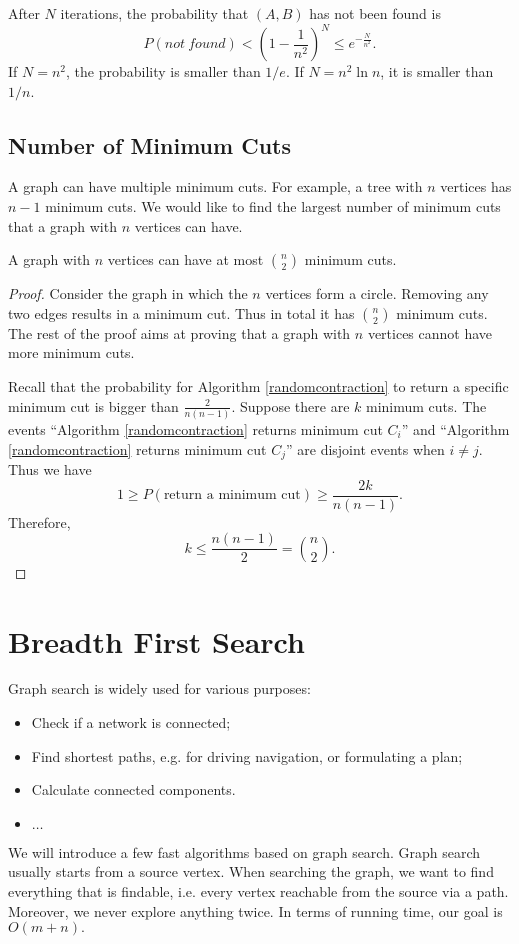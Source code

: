 After $N$ iterations, the probability that $(A,B)$ has not been found is 
\begin{equation*}
P(not\:found)<\left(1-\frac{1}{n^2}\right)^N\leq e^{-\frac{N}{n^2}}.
\end{equation*}
If $N=n^2$, the probability is smaller than $1/e$. If $N=n^2\ln n$, it is smaller than $1/n$. 
\subsection{Number of Minimum Cuts}
A graph can have multiple minimum cuts. For example, a tree with $n$ vertices has $n-1$ minimum cuts. We would like to find the largest number of minimum cuts that a graph with $n$ vertices can have.
\begin{theorem}
A graph with $n$ vertices can have at most $\binom{n}{2}$ minimum cuts.
\end{theorem}
\begin{proof}
Consider the graph in which the $n$ vertices form a circle. Removing any two edges results in a minimum cut. Thus in total it has $\binom{n}{2}$ minimum cuts. The rest of the proof aims at proving that a graph with $n$ vertices cannot have more minimum cuts.

Recall that the probability for Algorithm \ref{randomcontraction} to return a specific minimum cut is bigger than $\frac{2}{n(n-1)}$. Suppose there are $k$ minimum cuts. The events ``Algorithm \ref{randomcontraction} returns minimum cut $C_i$'' and  ``Algorithm \ref{randomcontraction} returns minimum cut $C_j$'' are disjoint events when $i\neq j$. Thus we have 
$$1\geq P(\text{return a minimum cut})\geq\frac{2k}{n(n-1)}.$$
Therefore, 
$$k\leq \frac{n(n-1)}{2}=\binom{n}{2}.$$
\end{proof}
\section{Breadth First Search}
Graph search is widely used for various purposes:
\begin{itemize}
\item Check if a network is connected;
\item Find shortest paths, e.g. for driving navigation, or formulating a plan;
\item Calculate connected components.
\item $\dots$
\end{itemize}
We will introduce a few fast algorithms based on graph search. Graph search usually starts from a source vertex. When searching the graph, we want to find everything that is findable, i.e. every vertex reachable from the source via a path. Moreover, we never explore anything twice. In terms of running time, our goal is $O(m+n).$ 
